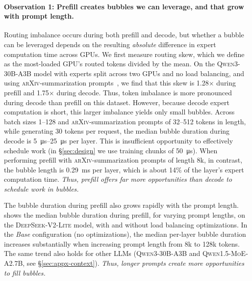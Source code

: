 \paragraph{Observation 1: Prefill creates bubbles we can leverage, and that grow
with prompt length.}
\label{sec:char-phase}
\label{sec:char-context}

Routing imbalance occurs during both prefill and decode, but whether a bubble can be leveraged depends on the resulting \emph{absolute} difference in expert computation time across GPUs.
We first measure routing skew, which we define as the most-loaded GPU's routed tokens divided by the mean.
On the \textsc{Qwen3-30B-A3B} model with experts split across two GPUs and no load balancing, and using \textsc{arXiv}-summarization prompts~\cite{cohan-etal-2018-discourse}, we find that this skew is 1.28$\times$ during prefill and 1.75$\times$ during decode.
Thus, token imbalance is more pronounced during decode than prefill on this dataset.
However, because decode expert computation is short, this larger imbalance yields only small bubbles.
Across batch sizes 1--128 and \textsc{arXiv}-summarization prompts of 32--512 tokens in length, while generating 30 tokens per request, the median bubble duration during decode is \SIrange{5}{25}{\micro\second} per layer. %
This is insufficient opportunity to effectively schedule work (in \S\ref{sec:design} we use training chunks of \SI{50}{\micro\second}).
When performing prefill with \textsc{arXiv}-summarization prompts of length 8k, in contrast, the bubble length is \SI{0.29}{\milli\second} per layer, which is about 14\% of the layer's expert computation time.
\emph{Thus, prefill offers far more opportunities than decode to schedule work in bubbles.}

The bubble duration during prefill also grows rapidly with the prompt length.
 shows the median bubble duration during prefill, for varying prompt lengths, on the \textsc{DeepSeek-V2-Lite} model, with and without load balancing optimizations.
In the \emph{Base} configuration (no optimizations), the median per-layer bubble duration increases substantially when increasing prompt length from 8k to 128k tokens.
The same trend also holds for other \acp{LLM} (\textsc{Qwen3-30B-A3B} and \textsc{Qwen1.5-MoE-A2.7B}, see \S\ref{sec:appx-context}).
\emph{Thus, longer prompts create more opportunities to fill bubbles.}

